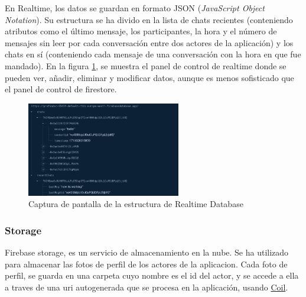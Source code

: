 En Realtime, los datos se guardan en formato JSON (\textit{JavaScript Object Notation}). Su estructura se ha divido en la lista de chats recientes (conteniendo atributos como el último mensaje, los participantes, la hora y el número de mensajes sin leer por cada conversación entre dos actores de la aplicación) y los chats en sí (conteniendo cada mensaje de una conversación con la hora en que fue mandado). En la figura \ref{fig:ejemplo_realtime}, se muestra el panel de control de realtime donde se pueden ver, añadir, eliminar y modificar datos, aunque es menos sofisticado que el panel de control de firestore.
\begin{figure}[h]
    \centering
    \includegraphics[width = 0.6\textwidth]{Imagenes/Fuentes/ejemplo_realtime.png}
    \caption{Captura de pantalla de la estructura de Realtime Database}
    \label{fig:ejemplo_realtime}
\end{figure}
\subsubsection{Storage}
Firebase storage\hyperlink{cap:biblio}{}, es un servicio de almacenamiento en la nube. Se ha utilizado para almacenar las fotos de perfil de los actores de la aplicacion. Cada foto de perfil, se guarda en una carpeta cuyo nombre es el id del actor, y se accede a ella a traves de una uri autogenerada que se procesa en la aplicación, usando \hyperlink{subsec:coil}{Coil}.

\hypertarget{subsec:datastore}{}
